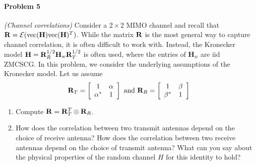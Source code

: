 \documentclass[12pt]{article}
\begin{document}
\paragraph{Problem 5} {\it (Channel correlations) } \quad
Consider a $2\times 2$ MIMO channel and recall that ${\bf R}=\mathcal{E}(\mathrm{vec}(\mathbf H)\mathrm{vec}(\mathbf H)^T)$.  While the   matrix ${\bf R}$ is the most general way to capture channel correlation, it is often difficult to work with.  Instead, the Kronecker model $\mathbf H={\bf R}_R^{1/2}\mathbf H_w{\bf R}_T^{1/2}$ is often used, where the entries of $\mathbf H_w$ are iid ZMCSCG.  In this problem, we consider the underlying assumptions of the Kronecker model.  Let us assume 
\begin{equation*}
{\bf R}_T =\left[ \begin{array}{cc}
 1 & \alpha\\
\alpha^* & 1
\end{array} \right]
\textrm{ and }
{\bf R}_R =\left[ \begin{array}{cc}
 1 & \beta\\
\beta^* & 1
\end{array} \right]
\end{equation*}

\begin{enumerate}
\item Compute ${\bf R}= {\bf R}_T^T \otimes {\bf R}_R$.
\item How does the correlation between two transmit antennas depend on the choice of receive antenna?  How does the correlation between two receive antennas depend on the choice of transmit antenna?  What can you say about the physical properties of the random channel $H$ for this identity to hold?
\end{enumerate}
\end{document}
